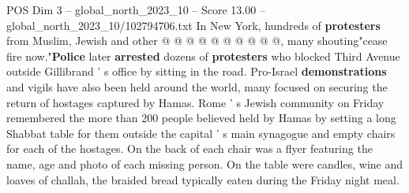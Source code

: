 \begin{textsample}{POS Dim 3 – global\_north\_2023\_10 – Score 13.00 – global\_north\_2023\_10/102794706.txt}
In New York, hundreds of \textbf{protesters} from Muslim, Jewish and other @ @ @ @ @ @ @ @ @ @, many shouting"cease fire now."\textbf{Police} later \textbf{arrested} dozens of \textbf{protesters} who blocked Third Avenue outside Gillibrand ' s office by sitting in the road.
Pro-Israel \textbf{demonstrations} and vigils have also been held around the world, many focused on securing the return of hostages captured by Hamas.
Rome ' s Jewish community on Friday remembered the more than 200 people believed held by Hamas by setting a long Shabbat table for them outside the capital ' s main synagogue and empty chairs for each of the hostages.
On the back of each chair was a flyer featuring the name, age and photo of each missing person.
On the table were candles, wine and loaves of challah, the braided bread typically eaten during the Friday night meal.

\end{textsample}
